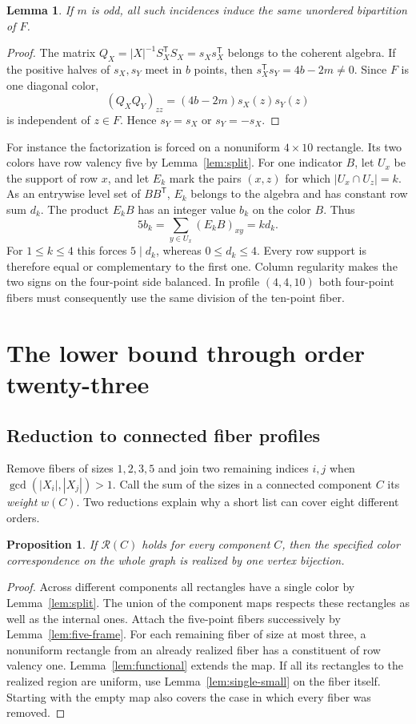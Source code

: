 \documentclass[11pt,reqno]{amsart}
\numberwithin{equation}{section}
\newtheorem{lemma}[theorem]{Lemma}
\newtheorem{proposition}[theorem]{Proposition}
\theoremstyle{definition}
\begin{document}
\begin{lemma}\label{lem:cuts}
If $m$ is odd, all such incidences induce the same unordered bipartition of $F$.
\end{lemma}
\begin{proof}
The matrix $Q_X=|X|^{-1}S_X^{\mathsf T}S_X=s_Xs_X^{\mathsf T}$ belongs to the coherent algebra. If the positive halves of $s_X,s_Y$ meet in $b$ points, then $s_X^{\mathsf T}s_Y=4b-2m\ne0$. Since $F$ is one diagonal color,
\[
      (Q_X Q_Y)_{zz}=(4b-2m)s_X(z)s_Y(z)
\]
is independent of $z\in F$. Hence $s_Y=s_X$ or $s_Y=-s_X$.
\end{proof}

For instance the factorization is forced on a nonuniform $4\times10$ rectangle. Its two colors have row valency five by Lemma~\ref{lem:split}. For one indicator $B$, let $U_x$ be the support of row $x$, and let $E_k$ mark the pairs $(x,z)$ for which $|U_x\cap U_z|=k$. As an entrywise level set of $BB^{\mathsf T}$, $E_k$ belongs to the algebra and has constant row sum $d_k$. The product $E_kB$ has an integer value $b_k$ on the color $B$. Thus
\[
 5b_k=\sum_{y\in U_x}(E_k B)_{xy}=k d_k .
\]
For $1\le k\le4$ this forces $5\mid d_k$, whereas $0\le d_k\le4$. Every row support is therefore equal or complementary to the first one. Column regularity makes the two signs on the four-point side balanced. In profile $(4,4,10)$ both four-point fibers must consequently use the same division of the ten-point fiber.

\section{The lower bound through order twenty-three}\label{sec:order-routes}
\subsection{Reduction to connected fiber profiles}
Remove fibers of sizes $1,2,3,5$ and join two remaining indices $i,j$ when $\gcd(|X_i|,|X_j|)>1$. Call the sum of the sizes in a connected component $C$ its \emph{weight} $w(C)$. Two reductions explain why a short list can cover eight different orders.

\begin{proposition}\label{prop:profile-reduce}
If $\mathcal R(C)$ holds for every component $C$, then the specified color correspondence on the whole graph is realized by one vertex bijection.
\end{proposition}
\begin{proof}
Across different components all rectangles have a single color by Lemma~\ref{lem:split}. The union of the component maps respects these rectangles as well as the internal ones. Attach the five-point fibers successively by Lemma~\ref{lem:five-frame}. For each remaining fiber of size at most three, a nonuniform rectangle from an already realized fiber has a constituent of row valency one. Lemma~\ref{lem:functional} extends the map. If all its rectangles to the realized region are uniform, use Lemma~\ref{lem:single-small} on the fiber itself. Starting with the empty map also covers the case in which every fiber was removed.
\end{proof}
\end{document}
